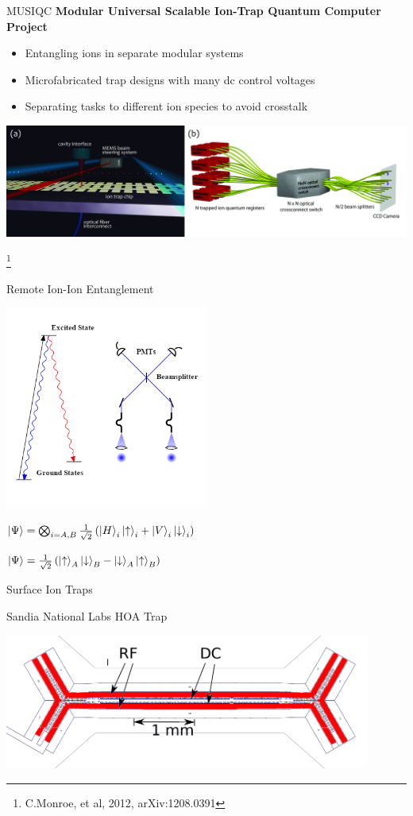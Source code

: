 \documentclass{beamer}
\begin{document}
\begin{frame}{MUSIQC}
\textbf{Modular Universal Scalable Ion-Trap Quantum Computer Project}
\begin{itemize}
	\item Entangling ions in separate modular systems
	\item Microfabricated trap designs with many dc control voltages
	\item Separating tasks to different ion species to avoid crosstalk
\end{itemize}
\vfill
\centerline{\includegraphics[height=0.38\textheight]{MUSIQC-plan}}
\let\thefootnote\relax\footnote[frame]{C.Monroe, et al, 2012, arXiv:1208.0391}
\end{frame}

\begin{frame}{Remote Ion-Ion Entanglement}
	\centerline{\includegraphics[width=0.5\textwidth]{remote-entanglement}}
	\centerline{$\ket{\Psi} = \bigotimes_{i=A,B} \frac{1}{\sqrt{2}} \left( \ket{H}_{i}\ket{\uparrow}_{i} + \ket{V}_{i}\ket{\downarrow}_{i} \right)$}
	\centerline{$\ket{\Psi} = \frac{1}{\sqrt{2}} \left( \ket{\uparrow}_A \ket{\downarrow}_B - \ket{\downarrow}_A \ket{\uparrow}_B \right)$}
\end{frame}

\begin{frame}{Surface Ion Traps}
	\centerline{\Large Sandia National Labs HOA Trap}
	\centerline{\includegraphics[width=0.9\textwidth]{HOA}}
\end{frame}
\end{document}
